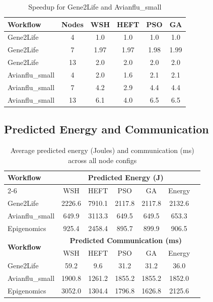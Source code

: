 \documentclass[12pt,a4paper]{article}
\begin{document}
\begin{table}[H]
\centering
\caption{Speedup for Gene2Life and Avianflu\_small}
\label{tab:speedup}
\begin{tabular}{@{}lccccc@{}}
\toprule
\textbf{Workflow} & \textbf{Nodes} & \textbf{WSH} & \textbf{HEFT} & \textbf{PSO} & \textbf{GA} \\
\midrule
Gene2Life & 4 & 1.0 & 1.0 & 1.0 & 1.0 \\
Gene2Life & 7 & 1.97 & 1.97 & 1.98 & 1.99 \\
Gene2Life & 13 & 2.0 & 2.0 & 2.0 & 2.0 \\
Avianflu\_small & 4 & 2.0 & 1.6 & 2.1 & 2.1 \\
Avianflu\_small & 7 & 4.2 & 2.9 & 4.4 & 4.4 \\
Avianflu\_small & 13 & 6.1 & 4.0 & 6.5 & 6.5 \\
\bottomrule
\end{tabular}
\end{table}

\subsection{Predicted Energy and Communication}

\begin{table}[H]
\centering
\caption{Average predicted energy (Joules) and communication (ms) across all node configs}
\label{tab:energy_comm}
\begin{tabular}{@{}lcccccc@{}}
\toprule
\multirow{2}{*}{\textbf{Workflow}} & \multicolumn{5}{c}{\textbf{Predicted Energy (J)}} \\
\cmidrule(lr){2-6}
 & WSH & HEFT & PSO & GA & Energy \\
\midrule
Gene2Life & 2226.6 & 7910.1 & 2117.8 & 2117.8 & 2132.6 \\
Avianflu\_small & 649.9 & 3113.3 & 649.5 & 649.5 & 653.3 \\
Epigenomics & 925.4 & 2458.4 & 895.7 & 899.9 & 906.5 \\
\midrule
\multirow{2}{*}{\textbf{Workflow}} & \multicolumn{5}{c}{\textbf{Predicted Communication (ms)}} \\
\cmidrule(lr){2-6}
 & WSH & HEFT & PSO & GA & Energy \\
\midrule
Gene2Life & 59.2 & 9.6 & 31.2 & 31.2 & 36.0 \\
Avianflu\_small & 1900.8 & 1261.2 & 1855.2 & 1855.2 & 1852.0 \\
Epigenomics & 3052.0 & 1304.4 & 1796.8 & 1626.8 & 2125.6 \\
\bottomrule
\end{tabular}
\end{table}
\end{document}
